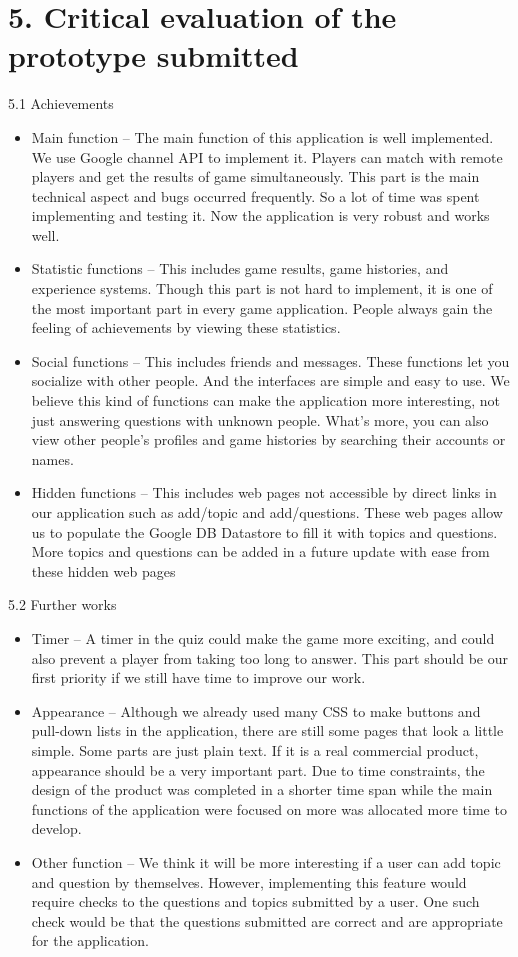 \documentclass{article}
\begin{document}
\section{5. Critical evaluation of the prototype submitted}

5.1 Achievements
\begin{itemize}
\item Main function – The main function of this application is well implemented. We use Google channel API to implement it. Players can match with remote players and get the results of game simultaneously. This part is the main technical aspect and bugs occurred frequently. So a lot of time was spent implementing and testing it. Now the application is very robust and works well.
\item Statistic functions – This includes game results, game histories, and experience systems. Though this part is not hard to implement, it is one of the most important part in every game application. People always gain the feeling of achievements by viewing these statistics.
\item Social functions – This includes friends and messages. These functions let you socialize with other people. And the interfaces are simple and easy to use. We believe this kind of functions can make the application more interesting, not just answering questions with unknown people. What’s more, you can also view other people’s profiles and game histories by searching their accounts or names.
\item Hidden functions – This includes web pages not accessible by direct links in our application such as add/topic and add/questions. These web pages allow us to populate the Google DB Datastore to fill it with topics and questions. More topics and questions can be added in a future update with ease from these hidden web pages
\end{itemize}

5.2 Further works
\begin{itemize}
\item Timer – A timer in the quiz could make the game more exciting, and could also prevent a player from taking too long to answer. This part should be our first priority if we still have time to improve our work.
\item Appearance – Although we already used many CSS to make buttons and pull-down lists in the application, there are still some pages that look a little simple. Some parts are just plain text. If it is a real commercial product, appearance should be a very important part. Due to time constraints, the design of the product was completed in a shorter time span while the main functions of the application were focused on more was allocated more time to develop. 
\item Other function – We think it will be more interesting if a user can add topic and question by themselves. However, implementing this feature would require checks to the questions and topics submitted by a user. One such check would be that the questions submitted are correct and are appropriate for the application.
\end{itemize}
\end{document}
